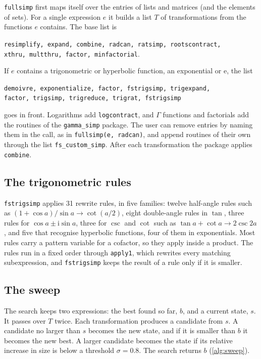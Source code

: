 \documentclass[11pt]{amsart}
\newcommand{\mx}{\lstinline[style=mx]}
\theoremstyle{definition}
\theoremstyle{remark}
\begin{document}
\texttt{fullsimp} first maps itself over the entries of lists and matrices
(and the elements of sets). For a
single expression $e$ it builds a list $T$ of transformations from the
functions $e$ contains. The base list is
\begin{center}
\mx|resimplify, expand, combine, radcan, ratsimp, rootscontract,|\\
\mx|xthru, multthru, factor, minfactorial|.
\end{center}
If $e$ contains a trigonometric or hyperbolic function, an exponential or
$\mathrm{e}$, the list
\begin{center}
\mx|demoivre, exponentialize, factor, fstrigsimp, trigexpand,|\\
\mx|factor, trigsimp, trigreduce, trigrat, fstrigsimp|
\end{center}
goes in front. Logarithms add
\mx|logcontract|, and $\Gamma$ functions and factorials add the routines of
the \texttt{gamma\_simp} package. The user can remove entries by naming them
in the call, as in \mx|fullsimp(e, radcan)|, and append routines of their own
through the list \mx|fs_custom_simp|. After each transformation the package
applies \mx|combine|.

\subsection{The trigonometric rules}\label{sec:fstrigsimp}

\mx|fstrigsimp| applies 31 rewrite rules, in five families: twelve half-angle
rules such as $(1+\cos a)/\sin a \to \cot(a/2)$, eight double-angle rules in
$\tan$, three rules for $\cos a \pm \mathrm{i}\sin a$, three for $\csc$ and
$\cot$ such as $\tan a + \cot a \to 2\csc 2a$, and five that recognise
hyperbolic functions, four of them in exponentials. Most rules carry a
pattern variable for a cofactor, so they apply inside a product. The rules run in a fixed
order through \mx|apply1|, which rewrites every matching subexpression, and
\mx|fstrigsimp| keeps the result of a rule only if it is smaller.

\subsection{The sweep}

The search keeps two expressions: the best found so far, $b$, and a current
state, $s$. It passes over $T$ twice. Each transformation produces a
candidate from $s$. A candidate no larger than $s$ becomes the new state,
and if it is smaller than $b$ it becomes the new best. A larger candidate
becomes the state if its relative increase in size is below a threshold
$\sigma = 0.8$. The search returns $b$ (\cref{alg:sweep}).
\end{document}
